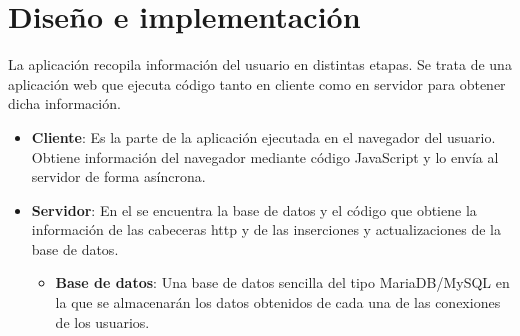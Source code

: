 \chapter{Diseño e implementación}
La aplicación recopila información del usuario en distintas etapas. Se trata de una aplicación web que ejecuta código tanto en cliente como en servidor para obtener dicha información.
\begin{itemize}
    \item \textbf{Cliente}: Es la parte de la aplicación ejecutada en el navegador del usuario. Obtiene información del navegador mediante código JavaScript y lo envía al servidor de forma asíncrona.
    \item \textbf{Servidor}: En el se encuentra la base de datos y el código que obtiene la información de las cabeceras http y de las inserciones y actualizaciones de la base de datos.
     \begin{itemize}
         \item \textbf{Base de datos}: Una base de datos sencilla del tipo MariaDB/MySQL en la que se almacenarán los datos obtenidos de cada una de las conexiones de los usuarios.
     \end{itemize}
\end{itemize}
